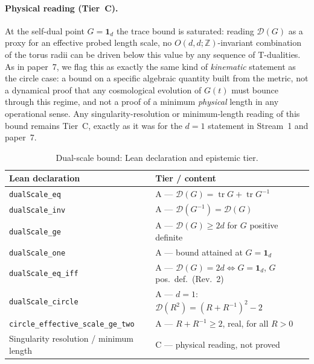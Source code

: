\documentclass[11pt,a4paper]{article}
\theoremstyle{remark}
\begin{document}
\paragraph{Physical reading (Tier~C).} At the self-dual point $G=\mathbf 1_d$ the trace bound is
saturated: reading $\mathcal{D}(G)$ as a proxy for an effective probed length scale, no
$O(d,d;\mathbb{Z})$-invariant combination of the torus radii can be driven below this value by any
sequence of T-dualities. As in paper~7, we flag this as exactly the same kind of \emph{kinematic}
statement as the circle case: a bound on a specific algebraic quantity built from the metric, not
a dynamical proof that any cosmological evolution of $G(t)$ must bounce through this regime, and
not a proof of a minimum \emph{physical} length in any operational sense. Any singularity-resolution
or minimum-length reading of this bound remains Tier~C, exactly as it was for the $d=1$ statement
in Stream~1 and paper~7.

\begin{table}[htbp]
\centering\footnotesize
\caption{Dual-scale bound: Lean declaration and epistemic tier.}
\label{tab:tracebound}
\begin{tabular}{@{}l l@{}}
\toprule
\textbf{Lean declaration} & \textbf{Tier / content} \\ \midrule
\texttt{dualScale\_eq} & A --- $\mathcal{D}(G)=\operatorname{tr}G+\operatorname{tr}G^{-1}$ \\
\texttt{dualScale\_inv} & A --- $\mathcal{D}(G^{-1})=\mathcal{D}(G)$ \\
\texttt{dualScale\_ge} & A --- $\mathcal{D}(G)\ge 2d$ for $G$ positive definite \\
\texttt{dualScale\_one} & A --- bound attained at $G=\mathbf 1_d$ \\
\texttt{dualScale\_eq\_iff} & A --- $\mathcal{D}(G)=2d\iff G=\mathbf 1_d$, $G$ pos.\ def.\ (Rev.~2) \\
\texttt{dualScale\_circle} & A --- $d=1$: $\mathcal{D}(R^2)=(R+R^{-1})^2-2$ \\
\texttt{circle\_effective\_scale\_ge\_two} & A --- $R+R^{-1}\ge2$, real, for all $R>0$ \\
Singularity resolution / minimum length & C --- physical reading, not proved \\
\bottomrule
\end{tabular}
\end{table}

\end{document}
